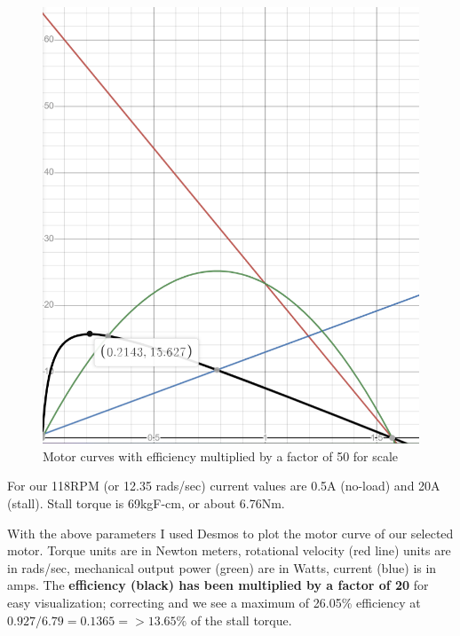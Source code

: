 \documentclass[a4paper, 10pt]{article}
\begin{document}
		\begin{figure} [!h]
			\centering
			\includegraphics[scale=0.5]{motor_curves_612}
			\caption{Motor curves with efficiency multiplied by a factor of 50 for scale}
			\label{motor_curves_612}
		\end{figure}
		
		For our 118RPM (or 12.35 rads/sec) current values are 0.5A (no-load) and 20A (stall). Stall torque is 69kgF-cm, or about 6.76Nm. 
		
		With the above parameters I used Desmos to plot the motor curve of our selected motor. Torque units are in Newton meters, rotational velocity (red line) units are in rads/sec, mechanical output power (green) are in Watts, current (blue) is in amps. The \textbf{efficiency (black) has been multiplied by a factor of 20} for easy visualization; correcting and we see a maximum of 26.05\% efficiency at $ 0.927/6.79 = 0.1365 => 13.65\% $ of the stall torque. 
		
\end{document}
